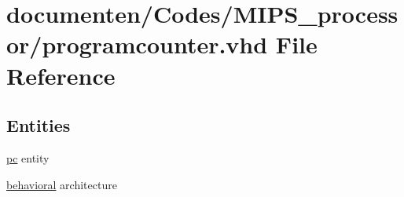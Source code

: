 \hypertarget{programcounter_8vhd}{\section{documenten/\-Codes/\-M\-I\-P\-S\-\_\-processor/programcounter.vhd File Reference}
\label{programcounter_8vhd}
}
\subsection*{Entities}
\begin{DoxyCompactItemize}
\item 
\hyperlink{classpc}{pc} entity
\item 
\hyperlink{classpc_1_1behavioral}{behavioral} architecture
\end{DoxyCompactItemize}
